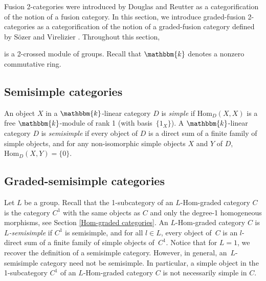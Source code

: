 \documentclass[a4paper, oneside]{amsart}
\makeatletter
\let\origsection\section
\renewcommand\section{\@ifstar{\starsection}{\nostarsection}}
\newcommand\nostarsection[1]
{\sectionprelude\origsection{#1}\sectionpostlude}
\newcommand\starsection[1]
{\sectionprelude\origsection*{#1}\sectionpostlude}
\newcommand\sectionprelude{%
  \vspace{1em}
}
\newcommand\sectionpostlude{%
  \vspace{1em}
}
\numberwithin{equation}{subsection}
\theoremstyle{referencedlemma}
\theoremstyle{plain} %
\theoremstyle{remark}
\makeatother
\begin{document}
\section{Graded-fusion 2-categories}\label{Section. Graded-fusion 2-categories}

\noindent Fusion 2-categories were introduced by Douglas and Reutter \cite{douglas_fusion_2018} as a categorification of the notion of a fusion category.  In this section, we introduce graded-fusion 2-categories as a categorification of the notion of a graded-fusion category defined by Sözer and Virelizier \cite{sozer_monoidal_2023}.  Throughout this section, 
\begin{center}
\end{center}
is a 2-crossed module of groups. Recall that $\mathbbm{k}$ denotes a nonzero commutative ring.  

\subsection{Semisimple categories}

An object $X$ in a $\mathbbm{k}$-linear category $D$ is \emph{simple} if $\mathrm{Hom}_D(X,X)$ is a free \mbox{$\mathbbm{k}$-mod}ule of rank 1 (with basis~$\{1_X\}$).  A $\mathbbm{k}$-linear category $D$ is \emph{semisimple} if every object of $D$ is a direct sum of a finite family of simple objects, and for any non-isomorphic simple objects $X$ and $Y$ of $D$,  $\mathrm{Hom}_D(X,Y) = \{0\}$.  

\subsection{Graded-semisimple categories}
Let $L$ be a group. Recall that the 1-subcategory of an $L$-Hom-graded category $C$ is the category $C^1$ with the same objects as $C$ and only the degree-1 homogeneous morphisms, see Section \ref{Hom-graded categories}. An $L$-Hom-graded category $C$ is \emph{$L$-semisimple} if $C^1$ is semisimple, and for all $l\in L$, every object of~$C$ is an $l$-direct sum of a finite family of simple objects of~$C^1$.  Notice that for $L = 1$, we recover the definition of a semisimple category. However, in general, an~\mbox{$L$-semi}simple category need not be semisimple.  In particular, a simple object in the 1-subcategory $C^1$ of an $L$-Hom-graded category $C$ is not necessarily simple in $C$. 
\end{document}
